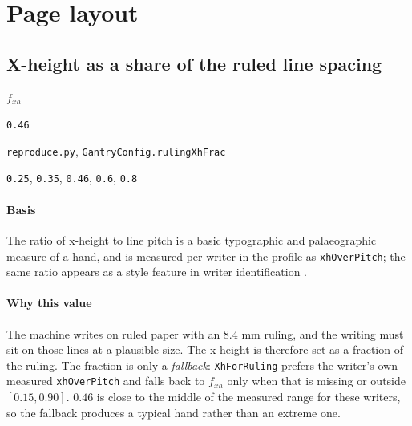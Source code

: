 \section{Page layout}

\subsection{X-height as a share of the ruled line spacing}

\label{coef:ruling-xh-frac}

\begin{description}[leftmargin=5.2em,style=sameline]

\item[Symbol] $f_{xh}$

\item[Value] \texttt{0.46}

\item[Source] \texttt{reproduce.py}, \texttt{GantryConfig.rulingXhFrac}

\item[Swept] \texttt{0.25}, \texttt{0.35}, \texttt{0.46}, \texttt{0.6}, \texttt{0.8}

\end{description}

\paragraph{Basis}

The ratio of x-height to line pitch is a basic typographic and palaeographic measure of a hand, and is measured per writer in the profile as \texttt{xhOverPitch}; the same ratio appears as a style feature in writer identification \cite{bulacu2007}.

\paragraph{Why this value}

The machine writes on ruled paper with an $8.4$ mm ruling, and the writing must sit on those lines at a plausible size. The x-height is therefore set as a fraction of the ruling. The fraction is only a \emph{fallback}: \texttt{XhForRuling} prefers the writer's own measured \texttt{xhOverPitch} and falls back to $f_{xh}$ only when that is missing or outside $[0.15,0.90]$. $0.46$ is close to the middle of the measured range for these writers, so the fallback produces a typical hand rather than an extreme one.

